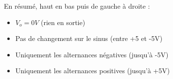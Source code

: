 \documentclass{../../template/tp}
\begin{document}
{En résumé, haut en bas puis de gauche à droite :
    \begin{itemize}
        \item $V_o = 0V$ (rien en sortie)
        \item Pas de changement sur le sinus (entre +5 et -5V)
        \item Uniquement les alternances négatives (jusqu'à -5V)
        \item Uniquement les alternances positives (jusqu'à +5V)
    \end{itemize}
}


\end{document}
